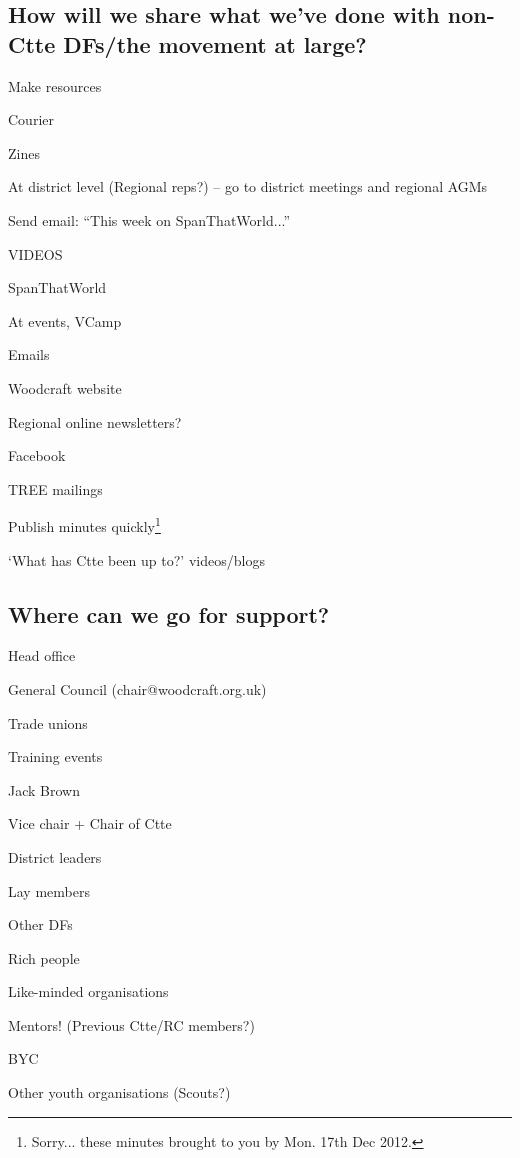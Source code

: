 \documentclass[a4paper, 12pt]{article}
\begin{document}
\subsection{How will we share what we've done with non-Ctte DFs/the movement at large?}
\begin{itemize*}
	\item Make resources
	\item Courier
	\item Zines
	\item At district level (Regional reps?) -- go to district meetings and regional AGMs
	\item Send email: ``This week on SpanThatWorld...''
	\item VIDEOS
	\item SpanThatWorld
	\item At events, VCamp
	\item Emails
	\item Woodcraft website
	\item Regional online newsletters?
	\item Facebook
	\item TREE mailings
	\item Publish minutes quickly\footnote{Sorry... these minutes brought to you by Mon. 17th Dec 2012.}
	\item `What has Ctte been up to?' videos/blogs
\end{itemize*}

\subsection{Where can we go for support?}
\begin{itemize*}
	\item Head office
	\item General Council (chair@woodcraft.org.uk)
	\item Trade unions
	\item Training events
	\item Jack Brown
	\item Vice chair + Chair of Ctte
	\item District leaders
	\item Lay members
	\item Other DFs
	\item Rich people
	\item Like-minded organisations
	\item Mentors! (Previous Ctte/RC members?)
	\item BYC
	\item Other youth organisations (Scouts?)
\end{itemize*}
\end{document}
